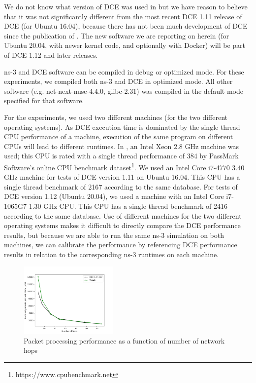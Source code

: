\documentclass{sig-alternate}
\begin{document}
We do not know what version of DCE was used in \cite{Tazaki13} but we
have reason to believe that it was not significantly different from the
most recent DCE 1.11 release of DCE (for Ubuntu 16.04), because there
has not been much development of DCE since the publication of \cite{Tazaki13}.
The new software we are reporting on herein (for Ubuntu 20.04, with newer
kernel code, and optionally with Docker) will be part of DCE 1.12 and
later releases.

ns-3 and DCE software can be compiled in debug or optimized mode.  For
these experiments, we compiled both ns-3 and DCE in optimized mode.  All
other software (e.g. net-next-nuse-4.4.0, glibc-2.31) was compiled in
the default mode specified for that software.

For the experiments, we used two different machines (for the two different
operating systems).  As DCE execution time is dominated by the single thread
CPU performance of a machine, execution of the same program on different CPUs
will lead to
different runtimes.  In \cite{Tazaki13}, an Intel Xeon 2.8 GHz machine was
used; this CPU is rated with a single thread performance of 384 by PassMark
Software's online CPU benchmark dataset\footnote{https://www.cpubenchmark.net}.
We used an Intel Core i7-4770 3.40 GHz machine for tests of DCE version 1.11
on Ubuntu 16.04.  This CPU has a single thread benchmark of 2167 according
to the same database.  For tests of DCE version 1.12 (Ubuntu 20.04), we used
a machine with an Intel Core i7-1065G7 1.30 GHz CPU.  This CPU has a
single thread benchmark of 2416 according to the same database.  Use of
different machines for the two different operating systems makes it difficult
to directly compare the DCE performance results, but because we are able to
run the same ns-3 simulation on both machines, we can calibrate the
performance by referencing DCE performance results in relation to the
corresponding ns-3 runtimes on each machine.

\begin{figure}[h!]
  \centering
    \includegraphics[width=0.43\textwidth]{figs/hops-vs-pps.png}
  \caption{Packet processing performance as a function of number of network hops}
  \label{fig:hops-vs-pps}
\end{figure}
\end{document}
